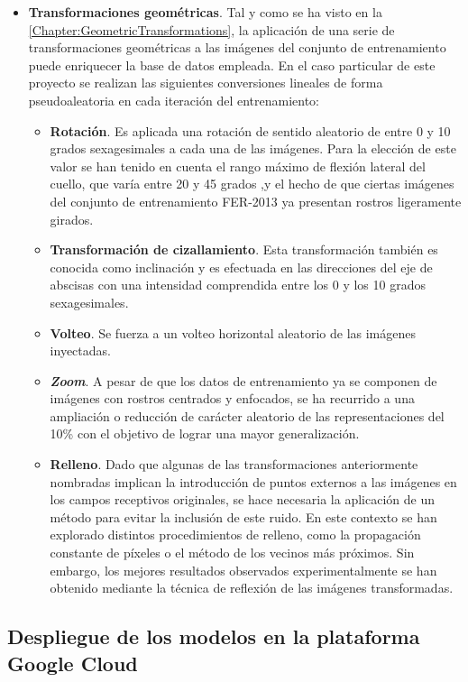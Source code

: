 \begin{itemize}
  \item \textbf{Transformaciones geométricas}. Tal y como se ha visto en la \autoref{Chapter:GeometricTransformations}, la aplicación de una serie de transformaciones geométricas a las imágenes del conjunto de entrenamiento puede enriquecer la base de datos empleada. En el caso particular de este proyecto se realizan las siguientes conversiones lineales de forma pseudoaleatoria en cada iteración del entrenamiento:
        \begin{itemize}
          \item \textbf{Rotación}. Es aplicada una rotación de sentido aleatorio de entre 0 y 10 grados sexagesimales a cada una de las imágenes. Para la elección de este valor se han tenido en cuenta el rango máximo de flexión lateral del cuello, que varía entre 20 y 45 grados \cite{LateralFlexion},y el hecho de que ciertas imágenes del conjunto de entrenamiento FER-2013 ya presentan rostros ligeramente girados.
          \item \textbf{Transformación de cizallamiento}. Esta transformación también es conocida como inclinación y es efectuada en las direcciones del eje de abscisas con una intensidad comprendida entre los 0 y los 10 grados sexagesimales.
          \item \textbf{Volteo}. Se fuerza a un volteo horizontal aleatorio de las imágenes inyectadas. 
          \item \textbf{\textit{Zoom}}. A pesar de que los datos de entrenamiento ya se componen de imágenes con rostros centrados y enfocados, se ha recurrido a una ampliación o reducción de carácter aleatorio de las representaciones del 10\% con el objetivo de lograr una mayor generalización.
          \item \textbf{Relleno}. Dado que algunas de las transformaciones anteriormente nombradas implican la introducción de puntos externos a las imágenes en los campos receptivos originales, se hace necesaria la aplicación de un método para evitar la inclusión de este ruido. En este contexto se han explorado distintos procedimientos de relleno, como la propagación constante de píxeles o el método de los vecinos más próximos. Sin embargo, los mejores resultados observados experimentalmente se han obtenido mediante la técnica de reflexión de las imágenes transformadas.
        \end{itemize}
\end{itemize}

\subsection{Despliegue de los modelos en la plataforma Google Cloud}

